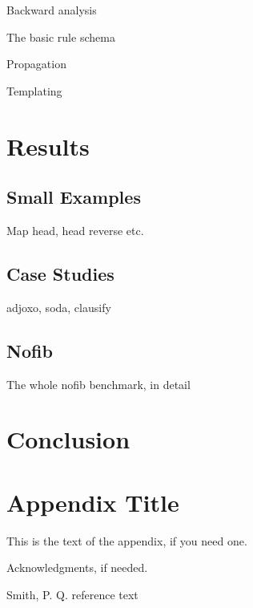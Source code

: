 \documentclass[preprint]{sigplanconf}
\begin{document}
Backward analysis

The basic rule schema

Propagation

Templating

\section{Results}
\label{chap:results}

\subsection{Small Examples}

Map head, head reverse etc.


\subsection{Case Studies}

adjoxo, soda, clausify

\subsection{Nofib}

The whole nofib benchmark, in detail

\section{Conclusion}
\label{chap:conc}






\appendix
\section{Appendix Title}

This is the text of the appendix, if you need one.

\acks

Acknowledgments, if needed.

\begin{thebibliography}{}

Smith, P. Q. reference text

\end{thebibliography}
\end{document}
